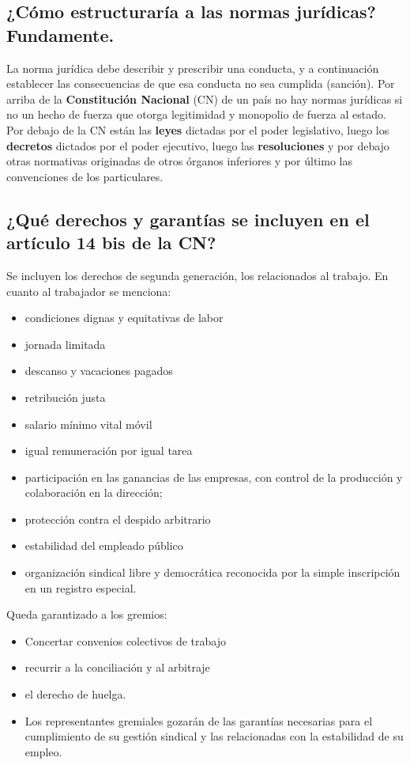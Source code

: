 \documentclass{article}
\begin{document}
\subsection{¿Cómo estructuraría a las normas jurídicas? Fundamente.}
La norma jurídica debe describir y prescribir una conducta, y a continuación establecer las consecuencias de que esa conducta no sea cumplida (sanción).
	Por arriba de la \textbf{Constitución Nacional} (CN) de un país no hay normas jurídicas si no un hecho de fuerza que otorga legitimidad y monopolio de fuerza al estado. Por debajo de la CN están las \textbf{leyes} dictadas por el poder legislativo, luego los \textbf{decretos} dictados por el poder ejecutivo, luego las \textbf{resoluciones} y por debajo otras normativas originadas de otros órganos inferiores y por último las convenciones de los particulares.
\subsection{¿Qué derechos y garantías se incluyen en el artículo 14 bis de la CN?}
Se incluyen los derechos de segunda generación, los relacionados al trabajo. 
En cuanto al trabajador se menciona:
\begin{itemize}
\item condiciones dignas y equitativas de labor
\item jornada limitada
\item descanso y vacaciones pagados
\item retribución justa
\item salario mínimo vital móvil
\item igual remuneración por igual tarea
\item participación en las ganancias de las empresas, con control de la producción y colaboración en la dirección;
\item protección contra el despido arbitrario
\item estabilidad del empleado público
\item organización sindical libre y democrática reconocida por la simple inscripción en un registro especial.
\end{itemize}
Queda garantizado a los gremios:
\begin{itemize}
\item Concertar convenios colectivos de trabajo
\item recurrir a la conciliación y al arbitraje
\item el derecho de huelga. 
\item Los representantes gremiales gozarán de las garantías necesarias para el cumplimiento de su gestión sindical y las relacionadas con la estabilidad de su empleo.
\end{itemize}
\end{document}
